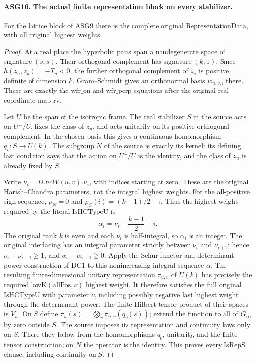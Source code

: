 \documentclass[11pt,a4paper]{article}
\numberwithin{equation}{section}
\theoremstyle{remark}\newtheorem{remark}[theorem]{Remark}
\begin{document}
\paragraph{ASG16. The actual finite representation block on every stabilizer.}
\label{claim:ASG16}
For the lattice block of ASG9 there is the complete original
\(\mathrm{RepresentationData}\), with all original highest weights.
\begin{proof}
At a real place the hyperbolic pairs span a nondegenerate space of
signature \((s,s)\).  Their orthogonal complement has signature
\((k,1)\).  Since \(h(z_u,z_u)=-T_u<0\), the further
orthogonal complement of \(z_u\) is positive definite of dimension
\(k\).  Gram--Schmidt gives an orthonormal basis \(w_{u,v,i}\)
there.  These are exactly the \(\mathrm{wfr\_\allowbreak on}\) and
\(\mathrm{wfr\_\allowbreak perp}\) equations after the original real
coordinate map \(\mathrm{rv}\).

Let \(U\) be the span of the isotropic frame.  The real stabilizer
\(S\) in the source acts on \(U^\perp/U\), fixes the class
of \(z_u\), and acts unitarily on its positive orthogonal
complement.  In the chosen basis this gives a continuous homomorphism
\(q_v:S\to U(k)\).  The subgroup \(N\) of the source is
exactly its kernel: its defining last condition says that the action
on \(U^\perp/U\) is the identity, and the class of \(z_u\)
is already fixed by \(S\).

Write \(\nu_i=D.hcW(u,v).u_i\), with indices starting at zero.
These are the original Harish--Chandra parameters, not the integral
highest weights.  For the all-positive sign sequence,
\(\rho_N=0\) and \(\rho_C(i)=(k-1)/2-i\).  Thus the
highest weight required by the literal \(\mathrm{IsHCTypeU}\) is
\[
       \alpha_i=\nu_i-\frac{k-1}{2}+i.
\]
The original rank \(k\) is even and each \(\nu_i\) is
half-integral, so \(\alpha_i\) is an integer.  The original
interlacing has an integral parameter strictly between
\(\nu_i\) and \(\nu_{i+1}\); hence
\(\nu_i-\nu_{i+1}\ge1\), and
\(\alpha_i-\alpha_{i+1}\ge0\).
Apply the Schur-functor and determinant-power construction of DC1
to this nonincreasing integral sequence \(\alpha\).
The resulting finite-dimensional unitary representation
\(\pi_{u,v}\) of \(U(k)\) has precisely the required
\(\mathrm{lowK}(\mathrm{allPos},\nu)\) highest weight.
It therefore satisfies the full original
\(\mathrm{IsHCTypeU}\) with parameter \(\nu\), including
possibly negative last highest weight through the determinant power.
The finite Hilbert tensor product of their spaces is \(V_u\).
On \(S\) define \(\pi_u(s)=\bigotimes_v\pi_{u,v}(q_v(s))\);
extend the function to all of \(G_\infty\) by zero outside \(S\).
The source imposes its representation and continuity laws only on
\(S\).  There they follow from the homomorphisms \(q_v\),
unitarity, and the finite tensor construction; on \(N\) the
operator is the identity.  This proves every \(\mathrm{IsRepS}\)
clause, including continuity on \(S\).


\end{proof}
\end{document}
